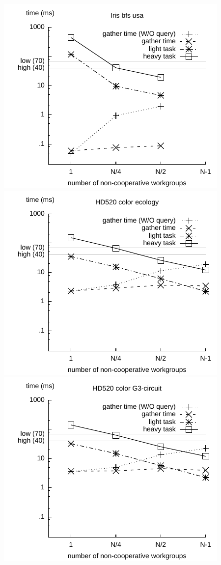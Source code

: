 \documentclass[parskip=half,sigconf,review, anonymous=true, acmcopyrightmode=none]{acmart}
\begin{document}
\includegraphics[width=.7\columnwidth]{images/barrier/iris_bfs_usa.pdf} \\
\includegraphics[width=.7\columnwidth]{images/barrier/hd520_color_ecology.pdf} \\
\includegraphics[width=.7\columnwidth]{images/barrier/hd520_color_G3_circuit.pdf} \\
\end{document}

